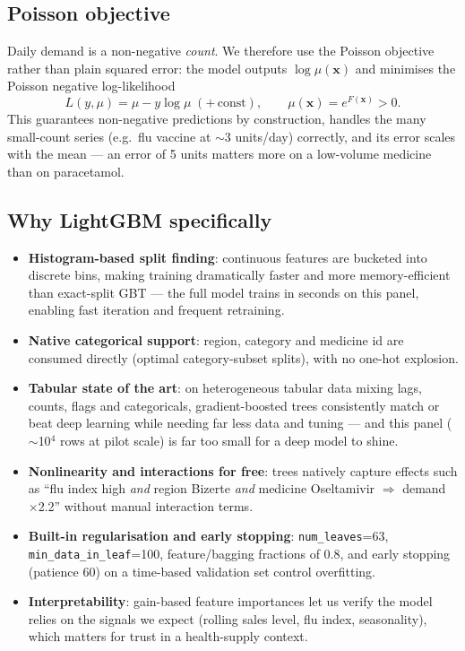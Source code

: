\documentclass[11pt,a4paper]{article}
\begin{document}
\subsection{Poisson objective}
Daily demand is a non-negative \emph{count}. We therefore use the Poisson objective rather than plain squared error: the model outputs $\log\mu(\mathbf{x})$ and minimises the Poisson negative log-likelihood
\begin{equation}
L(y, \mu) = \mu - y\log\mu \;(+\,\text{const}),
\qquad \mu(\mathbf{x}) = e^{F(\mathbf{x})} > 0 .
\end{equation}
This guarantees non-negative predictions by construction, handles the many small-count series (e.g.\ flu vaccine at $\sim$3 units/day) correctly, and its error scales with the mean --- an error of 5 units matters more on a low-volume medicine than on paracetamol.

\subsection{Why LightGBM specifically}
\begin{itemize}
  \item \textbf{Histogram-based split finding}: continuous features are bucketed into discrete bins, making training dramatically faster and more memory-efficient than exact-split GBT --- the full model trains in seconds on this panel, enabling fast iteration and frequent retraining.
  \item \textbf{Native categorical support}: region, category and medicine id are consumed directly (optimal category-subset splits), with no one-hot explosion.
  \item \textbf{Tabular state of the art}: on heterogeneous tabular data mixing lags, counts, flags and categoricals, gradient-boosted trees consistently match or beat deep learning while needing far less data and tuning --- and this panel ($\sim$10$^4$ rows at pilot scale) is far too small for a deep model to shine.
  \item \textbf{Nonlinearity and interactions for free}: trees natively capture effects such as ``flu index high \emph{and} region Bizerte \emph{and} medicine Oseltamivir $\Rightarrow$ demand $\times$2.2'' without manual interaction terms.
  \item \textbf{Built-in regularisation and early stopping}: \texttt{num\_leaves}=63, \texttt{min\_data\_in\_leaf}=100, feature/bagging fractions of 0.8, and early stopping (patience 60) on a time-based validation set control overfitting.
  \item \textbf{Interpretability}: gain-based feature importances let us verify the model relies on the signals we expect (rolling sales level, flu index, seasonality), which matters for trust in a health-supply context.
\end{itemize}
\end{document}
